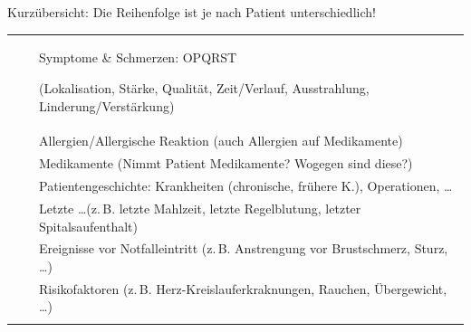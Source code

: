 \TableWide
{Kurzübersicht: }%
{Die Reihenfolge ist je nach Patient
unterschiedlich!}%
{\label{tab:checkliste-patientenmanagement-advanced}\label{tab:pam-weiterfuehrende-advanced}}%
{}%
{}%
{%
\begin{minipage}{\linewidth}
\FontTableBase
{\sffamily\FontTableBase\CorrectionItemizeBox\renewcommand{\itemhook}{%
  \setlength{\itemsep}{0.005\baselineskip}
  \setlength{\leftmargin}{1.4em}
  \setlength{\labelwidth}{0.9em}
}
\begin{tabulary}{\linewidth}[H]{lCL}
\toprule\addlinespace
{}
 &
{}
 &
Symptome {\&} Schmerzen: OPQRST

{\tiny(Lokalisation, Stärke,  Qualität, Zeit/Verlauf, 
 Ausstrahlung, Linderung/Verstärkung)}
\\\addlinespace
 &
{}
 &
Allergien/Allergische Reaktion (auch
Allergien auf Medikamente)
\\\addlinespace
 &
 {}
 &
Medikamente {\tiny(Nimmt Patient Medikamente?
Wogegen sind diese?)}
\\\addlinespace
 &
{}
 &
Patientengeschichte: Krankheiten {\tiny(chronische, frühere
K.)}, Operationen, \ldots 
\\\addlinespace
 &
 {}
 &
Letzte \ldots (z.\,B. letzte Mahlzeit, letzte
Regelblutung, letzter Spitalsaufenthalt)
\\\addlinespace
 &
 {}
 &
Ereignisse vor Notfalleintritt {\tiny(z.\,B.
Anstrengung vor Brustschmerz, Sturz, \ldots)}
\\\addlinespace
 &
 {}
 &
Risikofaktoren {\tiny(z.\,B.
Herz-Kreislauferkraknungen, Rauchen, Übergewicht, \ldots)}
\\\addlinespace\midrule\addlinespace


\end{tabulary}}
\end{minipage}}
